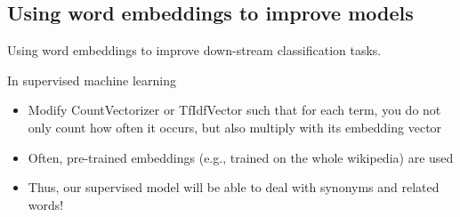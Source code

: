 \documentclass[compress]{beamer}
\begin{document}

\subsection[Improving down-stream classification tasks]{Using word embeddings to improve models}
\begin{frame}[plain]
	Using word embeddings to improve down-stream classification tasks.
\end{frame}

\begin{frame}{In supervised machine learning}
	\begin{itemize}[<+->]
		\item Modify CountVectorizer or TfIdfVector such that for each term, you do not only count how often it occurs, but also multiply with its embedding vector
		\item Often, pre-trained embeddings (e.g., trained on the whole wikipedia) are used
		\item Thus, our supervised model will be able to deal with synonyms and related words!
	\end{itemize}
	

	
\end{frame}
\end{document}
